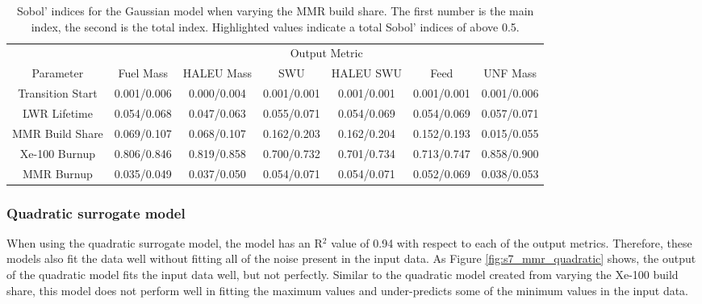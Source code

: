 \begin{table}[h!]
    \centering
    \caption{Sobol' indices for the Gaussian model when varying the MMR 
    build share. The first number is the main index, the second is the total 
    index. Highlighted 
    values indicate a total Sobol' indices of above 0.5.}
    \label{tab:s7_sobol_mmr_gaussian}
    \begin{tabular}{c c c c c c c}
        \hline
        & \multicolumn{6}{c}{Output Metric} \\
        Parameter & Fuel Mass & HALEU Mass & SWU & HALEU SWU & Feed & UNF Mass \\
        \hline
        Transition Start & 0.001/0.006 & 0.000/0.004 & 0.001/0.001 &
                           0.001/0.001 & 0.001/0.001 & 0.001/0.006\\
        LWR Lifetime & 0.054/0.068 & 0.047/0.063 & 0.055/0.071 &
                       0.054/0.069 & 0.054/0.069 & 0.057/0.071\\
        MMR Build Share & 0.069/0.107 & 0.068/0.107 & 0.162/0.203 &
                          0.162/0.204 & 0.152/0.193 & 0.015/0.055\\
        Xe-100 Burnup & \cellcolor{green!25}0.806/0.846 & \cellcolor{green!25}0.819/0.858 & \cellcolor{green!25}0.700/0.732 &
        \cellcolor{green!25}0.701/0.734 & \cellcolor{green!25}0.713/0.747 & \cellcolor{green!25}0.858/0.900\\
        MMR Burnup & 0.035/0.049 & 0.037/0.050 & 0.054/0.071 &
                     0.054/0.071 & 0.052/0.069 & 0.038/0.053\\
        \hline        
    \end{tabular}
\end{table}

\subsubsection{Quadratic surrogate model}
When using the quadratic surrogate model, the model has an R$^2$ value of 0.94
with respect to each of the output metrics. Therefore, these models also fit 
the data well without fitting all of the noise present in the input data. 
As Figure \ref{fig:s7_mmr_quadratic} shows, the output of the quadratic model 
fits the input data well, but not perfectly. Similar to the quadratic 
model created from varying the Xe-100 build share, this model 
does not perform well in fitting the maximum values and under-predicts 
some of the minimum values in the input data. 

